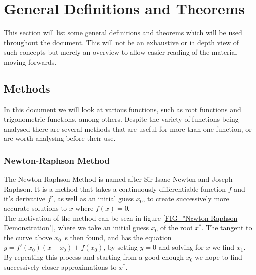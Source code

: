 \section{General Definitions and Theorems}
\label{SEC_"General Definitions and Theorems"}

This section will list some general definitions and theorems which will be used throughout the document. This will not be an exhaustive or in depth view of such concepts but merely an overview to allow easier reading of the material moving forwards.

\subsection{Methods}

In this document we will look at various functions, such as root functions and trigonometric functions, among others. Despite the variety of functions being analysed there are several methods that are useful for more than one function, or are worth analysing before their use.

\subsubsection{Newton-Raphson Method}
\label{SUBSUB_"Newton-Raphson Method"}

\theoremstyle{definition}
\newtheorem{Newton Method}{Definition}[subsubsection]

The Newton-Raphson Method is named after Sir Isaac Newton and Joseph Raphson\cite[][84]{BOK_NumMeth}. It is a method that takes a continuously differentiable function \(f\) and it's derivative \(f'\), as well as an initial guess \(x_0\), to create successively more accurate solutions to \(x\) where \(f(x) = 0\).\\

The motivation of the method can be seen in figure \ref{FIG_"Newton-Raphson Demonstration"}, where we take an initial guess \(x_0\) of the root \(x^\ast\). The tangent to the curve above \(x_0\) is then found, and has the equation \(y = f'(x_0)(x-x_0) + f(x_0)\), by setting \(y = 0\) and solving for \(x\) we find \(x_1\). By repeating this process and starting from a good enough \(x_0\) we hope to find successively closer approximations to \(x^\ast\).\\


